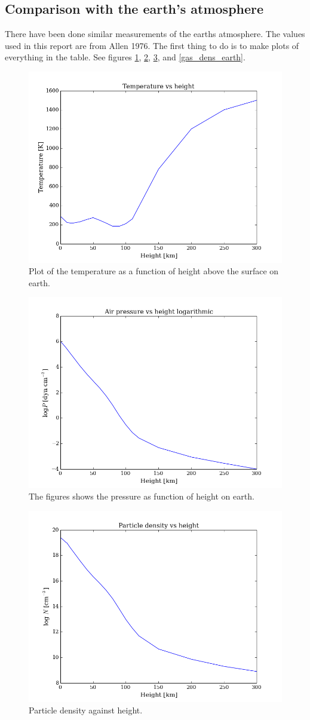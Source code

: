 \documentclass{aa}   %
\begin{document}
\subsection{Comparison with the earth's atmosphere}
There have been done similar measurements of the earths atmosphere. The values used in this report are from Allen 1976. 
The first thing to do is to make plots of everything in the table. See figures \ref{temp_earth}, \ref{pressure_earth}, \ref{particle_dens_earth}, and \ref{gas_dens_earth}.

\begin{figure}
 \includegraphics[width=.49\textwidth]{temp_earth.png}
 \caption{Plot of the temperature as a function of height above the surface on earth.}
 \label{temp_earth} 
\end{figure}

\begin{figure}
 \includegraphics[width=.49\textwidth]{pressure_earth.png}
 \caption{The figures shows the pressure as function of height on earth.}
 \label{pressure_earth} 
\end{figure}

\begin{figure}
 \includegraphics[width=.49\textwidth]{particle_dens_earth.png}
 \caption{Particle density against height.}
 \label{particle_dens_earth} 
\end{figure}
\end{document}
